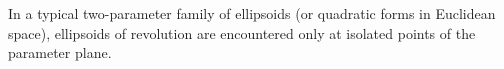 In a typical two-parameter family of ellipsoids (or quadratic forms in Euclidean space), ellipsoids of revolution are encountered only at isolated points of the parameter plane.
